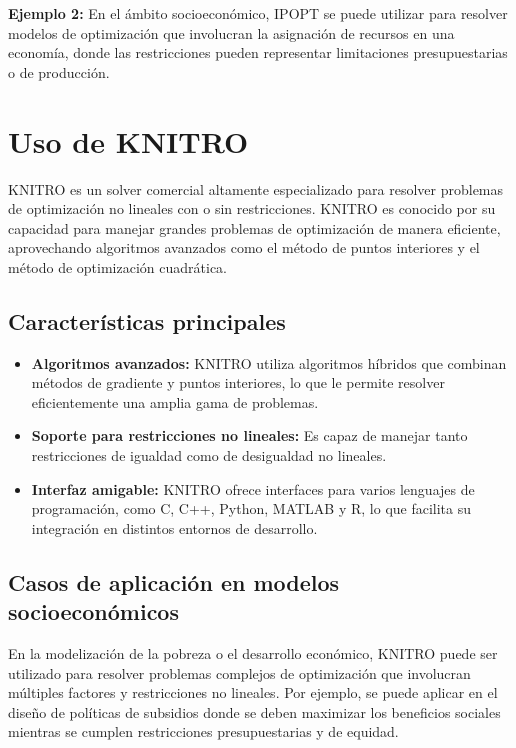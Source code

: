 \begin{flushleft}
	\textbf{Ejemplo 2:} En el ámbito socioeconómico, IPOPT se puede utilizar para resolver modelos de optimización que involucran la asignación de recursos en una economía, donde las restricciones pueden representar limitaciones presupuestarias o de producción.
\end{flushleft}

\section{Uso de KNITRO}

\begin{flushleft}
	KNITRO es un solver comercial altamente especializado para resolver problemas de optimización no lineales con o sin restricciones. KNITRO es conocido por su capacidad para manejar grandes problemas de optimización de manera eficiente, aprovechando algoritmos avanzados como el método de puntos interiores y el método de optimización cuadrática.
\end{flushleft}

\subsection{Características principales}

\begin{itemize}
	\item \textbf{Algoritmos avanzados:} KNITRO utiliza algoritmos híbridos que combinan métodos de gradiente y puntos interiores, lo que le permite resolver eficientemente una amplia gama de problemas.
	\item \textbf{Soporte para restricciones no lineales:} Es capaz de manejar tanto restricciones de igualdad como de desigualdad no lineales.
	\item \textbf{Interfaz amigable:} KNITRO ofrece interfaces para varios lenguajes de programación, como C, C++, Python, MATLAB y R, lo que facilita su integración en distintos entornos de desarrollo.
\end{itemize}

\subsection{Casos de aplicación en modelos socioeconómicos}

\begin{flushleft}
	En la modelización de la pobreza o el desarrollo económico, KNITRO puede ser utilizado para resolver problemas complejos de optimización que involucran múltiples factores y restricciones no lineales. Por ejemplo, se puede aplicar en el diseño de políticas de subsidios donde se deben maximizar los beneficios sociales mientras se cumplen restricciones presupuestarias y de equidad.
\end{flushleft}

